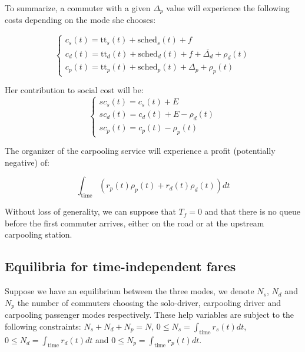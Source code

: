 \documentclass[english, a4paper]{article}
\theoremstyle{plain}
\theoremstyle{definition}
\theoremstyle{remark}
\begin{document}
To summarize, a commuter with a given $\Delta _p$ value will experience the following costs depending on the mode she chooses:

\begin{equation}
\left\{
\begin{array}{l}
    c_s(t) = \text{tt}_s(t) + \text{sched}_s(t) + f\\
    c_d(t) = \text{tt}_d(t) + \text{sched}_d(t) + f + \overline{\Delta _d} + \rho _d (t)\\
    c_p(t) = \text{tt}_p(t) + \text{sched}_p(t) + \Delta _p + \rho _p (t)
\end{array}
\right.
\end{equation}

Her contribution to social cost will be:
\begin{equation}
    \left\{
    \begin{array}{l}
        sc_s(t) = c_s(t) + E\\
        sc_d(t) = c_d(t) + E - \rho _d (t)\\
        sc_p(t) = c_p(t) - \rho _p(t)
    \end{array}
    \right.
\end{equation}

The organizer of the carpooling service will experience a profit (potentially negative) of:

\begin{equation}
    \int_{\text{time}} (r_p(t) \rho _p(t) + r_d(t) \rho _d(t)) dt
\end{equation}

Without loss of generality, we can suppose that $T_f = 0$ and that there is no queue before the first commuter arrives, either on the road or at the upstream carpooling station.


\subsection{Equilibria for time-independent fares}

Suppose we have an equilibrium between the three modes, we denote $N_s$, $N_d$ and $N_p$ the number of commuters choosing the solo-driver, carpooling driver and carpooling passenger modes respectively. These help variables are subject to the following constraints: $N_s + N_d + N_p = N$, $0 \leq N_s = \int_{\text{time}} r_s(t) dt$, $0 \leq N_d = \int_{\text{time}} r_d(t) dt$ and $0 \leq N_p = \int_{\text{time}} r_p(t) dt$.
\end{document}
